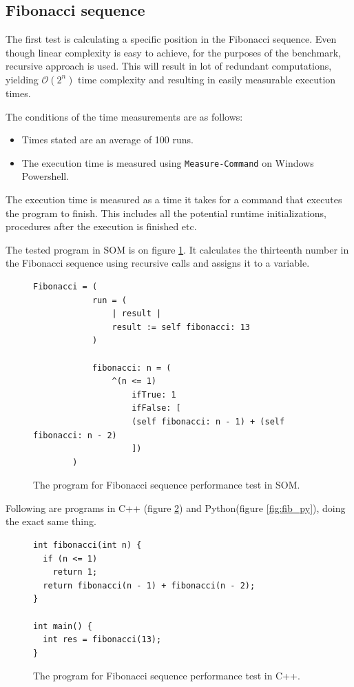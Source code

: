 \documentclass[thesis=M,english]{FITthesis}[2019/12/23]
\begin{document}
\subsection{Fibonacci sequence}
The first test is calculating a specific position in the Fibonacci sequence. Even though linear complexity is easy to achieve, for the purposes
of the benchmark, recursive approach is used. This will result in lot of redundant computations, yielding $\mathcal{O}(2 ^ n)$
time complexity and resulting in easily measurable execution times.

The conditions of the time measurements are as follows:
\begin{itemize}
	\item Times stated are an average of 100 runs.
	\item The execution time is measured using \texttt{Measure-Command} on Windows Powershell.
\end{itemize}

The execution time is measured as a time it takes for a command that executes the program to finish. This includes all the potential
runtime initializations, procedures after the execution is finished etc.  

The tested program in SOM is on figure \ref{fig:fib_som}. It calculates the thirteenth number in the Fibonacci sequence using recursive calls and
assigns it to a variable.
\begin{figure}
	\centering
	\begin{lstlisting}[language=Smalltalk]
		Fibonacci = (
			run = (
				| result |
				result := self fibonacci: 13
			)

			fibonacci: n = (
				^(n <= 1)
					ifTrue: 1
					ifFalse: [ 
					(self fibonacci: n - 1) + (self fibonacci: n - 2)
					])
		)
	\end{lstlisting}
	\caption{The program for Fibonacci sequence performance test in SOM.}
	\label{fig:fib_som}
\end{figure}

Following are programs in C++ (figure \ref{fig:fib_cpp}) and Python(figure \ref{fig:fib_py}), doing the exact same thing.
\begin{figure}
	\centering
	\begin{verbatim}
int fibonacci(int n) {
  if (n <= 1)
    return 1;
  return fibonacci(n - 1) + fibonacci(n - 2);
}

int main() {
  int res = fibonacci(13);
}
	\end{verbatim}
	\caption{The program for Fibonacci sequence performance test in C++.}
	\label{fig:fib_cpp}
\end{figure}
\end{document}
